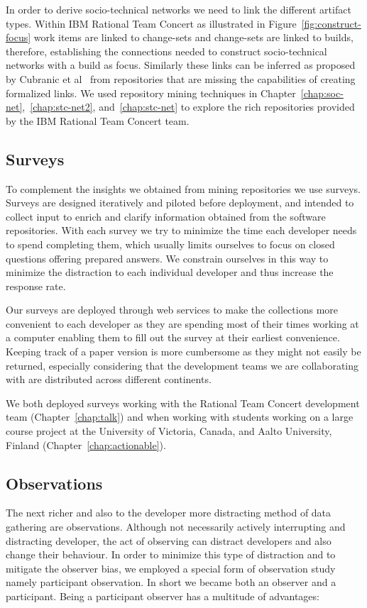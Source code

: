 In order to derive socio-technical networks we need to link the different artifact types.
Within IBM Rational Team Concert as illustrated in Figure~\ref{fig:construct-focus} work items are linked to change-sets and change-sets are linked to builds, therefore, establishing the connections needed to construct socio-technical networks with a build as focus.
Similarly these links can be inferred as proposed by Cubranic et al~\cite{cubranic:tse:2005} from repositories that are missing the capabilities of creating formalized links.
We used repository mining techniques in Chapter~\ref{chap:soc-net},~\ref{chap:stc-net2}, and~\ref{chap:stc-net} to explore the rich repositories provided by the IBM Rational Team Concert team.

\subsection{Surveys}
To complement the insights we obtained from mining repositories we use surveys.
Surveys are designed iteratively and piloted before deployment, and intended to collect input to enrich and clarify information obtained from the software repositories. 
With each survey we try to minimize the time each developer needs to spend completing them, which usually limits ourselves to focus on closed questions offering prepared answers.
We constrain ourselves in this way to minimize the distraction to each individual developer and thus increase the response rate.

Our surveys are deployed through web services to make the collections more convenient to each developer as they are spending most of their times working at a computer enabling them to fill out the survey at their earliest convenience.
Keeping track of a paper version is more cumbersome as they might not easily be returned, especially considering that the development teams we are collaborating with are distributed across different continents.

We both deployed surveys working with the Rational Team Concert development team (Chapter~\ref{chap:talk}) and when working with students working on a large course project at the University of Victoria, Canada, and Aalto University, Finland (Chapter~\ref{chap:actionable}).


\subsection{Observations}
The next richer and also to the developer more distracting method of data gathering are observations.
Although not necessarily actively interrupting and distracting developer, the act of observing can distract developers and also change their behaviour.
In order to minimize this type of distraction and to mitigate the observer bias, we employed a special form of observation study namely participant observation.
In short we became both an observer and a participant.
%
Being a participant observer has a multitude of advantages:

